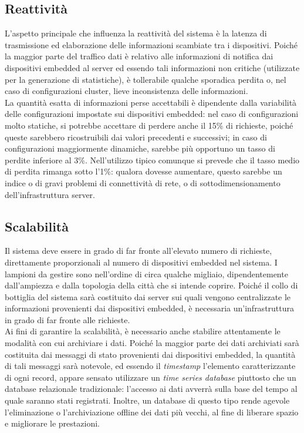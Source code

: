 \subsection{Reattività}
L'aspetto principale che influenza la reattività del sistema è la latenza di trasmissione ed elaborazione delle informazioni scambiate tra i dispositivi.
Poiché la maggior parte del traffico dati è relativo alle informazioni di notifica dai dispositivi embedded al server ed essendo tali informazioni non critiche (utilizzate per la generazione di statistiche), è tollerabile qualche sporadica perdita o, nel caso di configurazioni cluster, lieve inconsistenza delle informazioni.
\\La quantità esatta di informazioni perse accettabili è dipendente dalla variabilità delle configurazioni impostate sui dispositivi embedded: nel caso di configurazioni molto statiche, si potrebbe accettare di perdere anche il 15\% di richieste, poiché queste sarebbero ricostruibili dai valori precedenti e successivi; in caso di configurazioni maggiormente dinamiche, sarebbe più opportuno un tasso di perdite inferiore al 3\%.
Nell’utilizzo tipico comunque si prevede che il tasso medio di perdita rimanga sotto l’1\%: qualora dovesse aumentare, questo sarebbe un indice o di gravi problemi di connettività di rete, o di sottodimensionamento dell'infrastruttura server.

\subsection{Scalabilità}
Il sistema deve essere in grado di far fronte all'elevato numero di richieste, direttamente proporzionali al numero di dispositivi embedded nel sistema.
I lampioni da gestire sono nell'ordine di circa qualche migliaio, dipendentemente dall'ampiezza e dalla topologia della città che si intende coprire.
Poiché il collo di bottiglia del sistema sarà costituito dai server sui quali vengono centralizzate le informazioni provenienti dai dispositivi embedded, è necessaria un'infrastruttura in grado di far fronte alle richieste.
\\Ai fini di garantire la scalabilità, è necessario anche stabilire attentamente le modalità con cui archiviare i dati.
Poiché la maggior parte dei dati archiviati sarà costituita dai messaggi di stato provenienti dai dispositivi embedded, la quantità di tali messaggi sarà notevole, ed essendo il \textit{timestamp} l'elemento caratterizzante di ogni record, appare sensato utilizzare un \textit{time series database} piuttosto che un database relazionale tradizionale: l'accesso ai dati avverrà sulla base del tempo al quale saranno stati registrati.
Inoltre, un database di questo tipo rende agevole l'eliminazione o l'archiviazione offline dei dati più vecchi, al fine di liberare spazio e migliorare le prestazioni.

